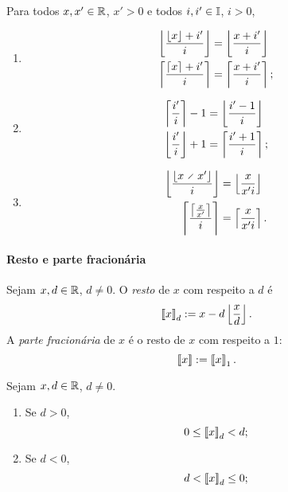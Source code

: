 \begin{exercise}
Para todos $x,x' \in \mathbb{R}$, $x'>0$ e todos $i,i' \in \mathbb{I}$, $i>0$,
	\begin{enumerate}
	\item 
		\begin{align*}
		\left\lfloor{\frac{\left\lfloor{x}\right\rfloor+i'}{i}}\right\rfloor &= \left\lfloor{\frac{x+i'}{i}}\right\rfloor \\
		\left\lceil{\frac{\left\lceil{x}\right\rceil+i'}{i}}\right\rceil &= \left\lceil{\frac{x+i'}{i}}\right\rceil;
		\end{align*}

	\item
		\begin{align*}
		\left\lceil{\frac{i'}{i}}\right\rceil - 1 &= \left\lfloor{\frac{i'-1}{i}}\right\rfloor \\
		\left\lfloor{\frac{i'}{i}}\right\rfloor + 1 &= \left\lceil{\frac{i'+1}{i}}\right\rceil;
		\end{align*}

	\item	
		\begin{align*}
		\chao{\frac{\chao{x \div x'}}{i}} &= \chao{\frac{x}{x'i}} \\	
		\teto{\frac{\teto{\frac{x}{x'}}}{i}} &= \teto{\frac{x}{x'i}}.
		\end{align*}
	
	\end{enumerate}
\end{exercise}




\paragraph{Resto e parte fracionária}

\begin{definition}
Sejam $x,d \in \mathbb{R}$, $d \neq 0$. O \emph{resto} de $x$ com respeito a $d$ é
	\begin{equation*}
	\left\llbracket{x}\right\rrbracket_{d} := x - d\left\lfloor{\frac{x}{d}}\right\rfloor.
	\end{equation*}
A \emph{parte fracionária} de $x$ é o resto de $x$ com respeito a $1$:
	\begin{equation*}
	\left\llbracket{x}\right\rrbracket := \left\llbracket{x}\right\rrbracket_{1}.
	\end{equation*}
\end{definition}

\begin{exercise}
Sejam $x,d \in \mathbb{R}$, $d \neq 0$.
	\begin{enumerate}
	\item Se $d>0$,
		\begin{equation*}
		0 \leq \left\llbracket{x}\right\rrbracket_{d} < d;
		\end{equation*}

	\item Se $d<0$,
		\begin{equation*}
		d < \left\llbracket{x}\right\rrbracket_{d} \leq 0;
		\end{equation*}
	\end{enumerate}
\end{exercise}





